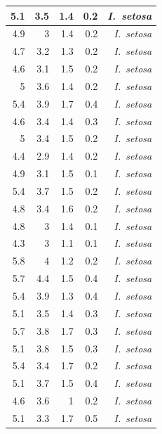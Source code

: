 \begin{enumerate}
\begin{center}
\begin{longtable}{|r|r|r|r|r|}
				\hline
				\endhead
				5.1   & 3.5   & 1.4   & 0.2   & \textit{I. setosa} \\
				\hline
				4.9   & 3     & 1.4   & 0.2   & \textit{I. setosa} \\
				\hline
				4.7   & 3.2   & 1.3   & 0.2   & \textit{I. setosa} \\
				\hline
				4.6   & 3.1   & 1.5   & 0.2   & \textit{I. setosa} \\
				\hline
				5     & 3.6   & 1.4   & 0.2   & \textit{I. setosa} \\
				\hline
				5.4   & 3.9   & 1.7   & 0.4   & \textit{I. setosa} \\
				\hline
				4.6   & 3.4   & 1.4   & 0.3   & \textit{I. setosa} \\
				\hline
				5     & 3.4   & 1.5   & 0.2   & \textit{I. setosa} \\
				\hline
				4.4   & 2.9   & 1.4   & 0.2   & \textit{I. setosa} \\
				\hline
				4.9   & 3.1   & 1.5   & 0.1   & \textit{I. setosa} \\
				\hline
				5.4   & 3.7   & 1.5   & 0.2   & \textit{I. setosa} \\
				\hline
				4.8   & 3.4   & 1.6   & 0.2   & \textit{I. setosa} \\
				\hline
				4.8   & 3     & 1.4   & 0.1   & \textit{I. setosa} \\
				\hline
				4.3   & 3     & 1.1   & 0.1   & \textit{I. setosa} \\
				\hline
				5.8   & 4     & 1.2   & 0.2   & \textit{I. setosa} \\
				\hline
				5.7   & 4.4   & 1.5   & 0.4   & \textit{I. setosa} \\
				\hline
				5.4   & 3.9   & 1.3   & 0.4   & \textit{I. setosa} \\
				\hline
				5.1   & 3.5   & 1.4   & 0.3   & \textit{I. setosa} \\
				\hline
				5.7   & 3.8   & 1.7   & 0.3   & \textit{I. setosa} \\
				\hline
				5.1   & 3.8   & 1.5   & 0.3   & \textit{I. setosa} \\
				\hline
				5.4   & 3.4   & 1.7   & 0.2   & \textit{I. setosa} \\
				\hline
				5.1   & 3.7   & 1.5   & 0.4   & \textit{I. setosa} \\
				\hline
				4.6   & 3.6   & 1     & 0.2   & \textit{I. setosa} \\
				\hline
				5.1   & 3.3   & 1.7   & 0.5   & \textit{I. setosa} \\

\end{longtable}
\end{center}
\end{enumerate}
